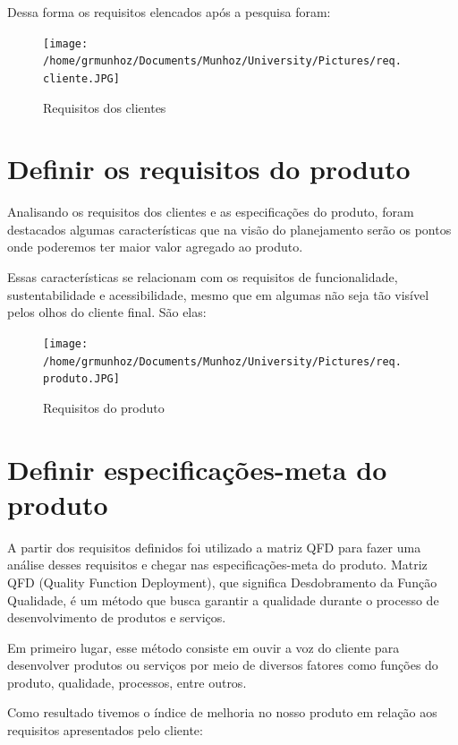 \documentclass[
	12pt,				%
	openright,			%
	oneside,			%
	a4paper,			%
	english,			%
	french,				%
	spanish,			%
	brazil				%
	]{abntex2}
\begin{document}
Dessa forma os requisitos elencados após a pesquisa foram:

\begin{figure}[H]
\begin{center}
\caption{Requisitos dos clientes}
\texttt{[image: /home/grmunhoz/Documents/Munhoz/University/Pictures/req. cliente.JPG]} 
\end{center}
\end{figure}

\section{Definir os requisitos do produto}

Analisando os requisitos dos clientes e as especificações do produto, foram destacados algumas características que na visão do planejamento serão os pontos onde poderemos ter maior valor agregado ao produto.

Essas características se relacionam com os requisitos de funcionalidade, sustentabilidade e acessibilidade, mesmo que em algumas não seja tão visível pelos olhos do cliente final. São elas:

\begin{figure}[H]
\begin{center}
\caption{Requisitos do produto}
\texttt{[image: /home/grmunhoz/Documents/Munhoz/University/Pictures/req. produto.JPG]} 
\end{center}
\end{figure}


\section{Definir especificações-meta do produto}

A partir dos requisitos definidos foi utilizado a matriz QFD para fazer uma análise desses requisitos e chegar nas especificações-meta do produto. Matriz QFD (Quality Function Deployment), que significa Desdobramento da Função Qualidade, é um método que busca garantir a qualidade durante o processo de desenvolvimento de produtos e serviços.

Em primeiro lugar, esse método consiste em ouvir a voz do cliente para desenvolver produtos ou serviços por meio de diversos fatores como funções do produto, qualidade, processos, entre outros.

Como resultado tivemos o índice de melhoria no nosso produto em relação aos requisitos apresentados pelo cliente:
\end{document}
